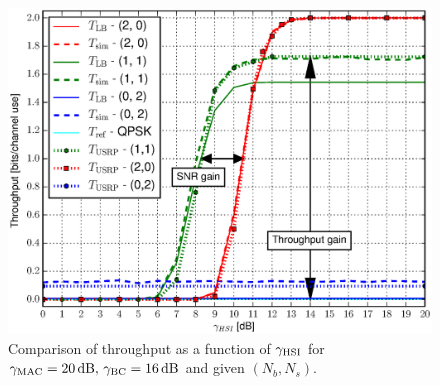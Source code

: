 \documentclass{article}
\begin{document}
\begin{figure}
\begin{centering}
\hspace*{-0.04\columnwidth}\includegraphics[clip,width=0.95\columnwidth]{fig/Throughput_HSI_XOR_MAC20_BC16_N2}
\par\end{centering}

\caption{Comparison of throughput as a function of $\gamma_{{\rm {HSI}}}$
for $\gamma_{{\rm {MAC}}}=20\,\mathrm{dB},\,\gamma_{{\rm {BC}}}=16\,\mathrm{dB}$
and given $(N_{b},N_{s})$. \label{fig:CTUpp_Throughput20_16}}
\end{figure}
\end{document}
